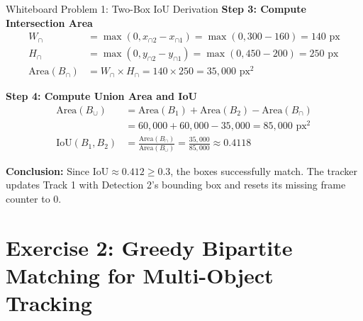 \documentclass[11pt,a4paper,oneside]{report}
\begin{document}
\begin{interviewq}{Whiteboard Problem 1: Two-Box IoU Derivation}
\textbf{Step 3: Compute Intersection Area}
\begin{align*}
W_{\cap} &= \max(0, x_{\cap 2} - x_{\cap 1}) = \max(0, 300 - 160) = 140 \text{ px} \\
H_{\cap} &= \max(0, y_{\cap 2} - y_{\cap 1}) = \max(0, 450 - 200) = 250 \text{ px} \\
\text{Area}(B_{\cap}) &= W_{\cap} \times H_{\cap} = 140 \times 250 = 35{,}000 \text{ px}^2
\end{align*}

\textbf{Step 4: Compute Union Area and IoU}
\begin{align*}
\text{Area}(B_{\cup}) &= \text{Area}(B_1) + \text{Area}(B_2) - \text{Area}(B_{\cap}) \\
&= 60{,}000 + 60{,}000 - 35{,}000 = 85{,}000 \text{ px}^2 \\[6pt]
\text{IoU}(B_1, B_2) &= \frac{\text{Area}(B_{\cap})}{\text{Area}(B_{\cup})} = \frac{35{,}000}{85{,}000} \approx \mathbf{0.4118}
\end{align*}

\textbf{Conclusion:} Since $\text{IoU} \approx 0.412 \ge 0.3$, the boxes successfully match. The tracker updates Track 1 with Detection 2's bounding box and resets its missing frame counter to 0.
\end{interviewq}

\section{Exercise 2: Greedy Bipartite Matching for Multi-Object Tracking}
\label{sec:wb_matching}
\end{document}
